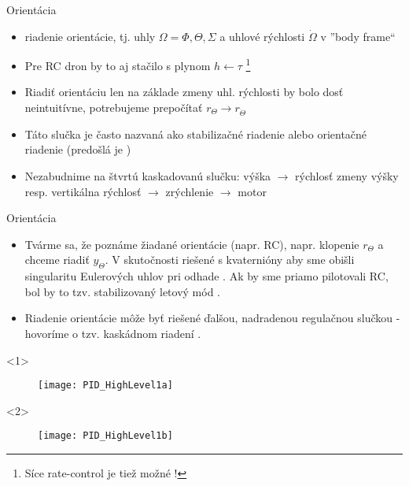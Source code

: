 \begin{frame}[t]{Orientácia}
\begin{itemize}
  \item<1-> riadenie orientácie, tj. uhly $\Omega={\Phi, \Theta, \Sigma}$ a uhlové rýchlosti $\dot\Omega$ v ''body frame``
  \item<2-> Pre RC dron by to aj stačilo s plynom $h\leftarrow\tau$ \footnote{Síce rate-control je tiež možné \citep{Boland2015}!} \citep{Boland2015}
  \item<3-> Riadiť orientáciu  len na základe zmeny uhl. rýchlosti  by bolo dosť neintuitívne, potrebujeme prepočítať $r_{\Theta} \rightarrow r_{\dot{\Theta}}$
      \item<4-> Táto slučka je často nazvaná ako stabilizačné riadenie  alebo orientačné riadenie  (predošlá je )
      \item<5-> Nezabudnime na štvrtú kaskadovanú slučku: výška $\rightarrow$ rýchlosť zmeny výšky resp. vertikálna rýchlosť  $\rightarrow$ zrýchlenie $\rightarrow$ motor
\end{itemize}
\end{frame}


\begin{frame}[t]{Orientácia}
\begin{itemize}
  \item<1-> Tvárme sa, že poznáme žiadané orientácie (napr. RC), napr. klopenie $r_{\Theta}$ a chceme riadiť $y_{\Theta}$.  V skutočnosti riešené s kvaternióny aby sme obišli singularitu Eulerových uhlov pri odhade \citep{Erasmus2020}. Ak by sme priamo pilotovali RC, bol by to tzv. stabilizovaný letový mód \citep{Boland2015}.
  \item<2-> Riadenie orientácie môže byť riešené ďalšou, nadradenou regulačnou slučkou - hovoríme o tzv. kaskádnom riadení .
  \end{itemize}


    \begin{onlyenv}<1>
  \begin{figure}
\centering
  \texttt{[image: PID\_HighLevel1a]}\\
\end{figure}
\end{onlyenv}



    \begin{onlyenv}<2>
  \begin{figure}
\centering
  \texttt{[image: PID\_HighLevel1b]}\\
\end{figure}
\end{onlyenv}

  \end{frame}



